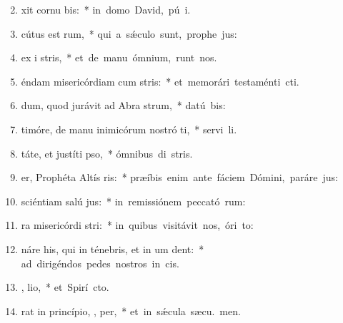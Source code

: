 \begin{flushleft}
\begin{enumerate}[leftmargin=*]
\setcounter{enumi}{1}

\item {}xit cornu  bis:~* \mbox{in domo David, pú i.}
\item {}cútus est   rum,~* \mbox{qui a s\'{\ae}culo sunt, prophe jus:}
\item {} ex i stris,~* \mbox{et de manu ómnium,  runt nos.}
\item {}éndam misericórdiam cum  stris:~* \mbox{et memorári testaménti  cti.}
\item {}dum, quod jurávit ad Abra  strum,~* \mbox{datú  bis:}
\item {} timóre, de manu inimicórum nostró ti,~* \mbox{servi li.}
\item {}táte, et justíti  pso,~* \mbox{ómnibus di stris.}
\item {}er, Prophéta Altís ris:~* \mbox{præíbis enim ante fáciem Dómini, paráre  jus:}
\item {} sciéntiam salú  jus:~* \mbox{in remissiónem peccató rum:}
\item {}ra misericórdi  stri:~* \mbox{in quibus visitávit nos, óri  to:}
\item {}náre his, qui in ténebris, et in um  dent:~* \mbox{ad dirigéndos pedes nostros in  cis.}
\item {} ,  lio,~* \mbox{et Spirí cto.}
\item {}rat in princípio,  ,  per,~* \mbox{et in s\'{\ae}cula sæcu. men.}

\end{enumerate}
\end{flushleft}

